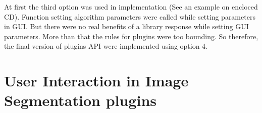 At first the third option was used in implementation (See an example on encloced CD). Function setting algorithm parameters were called while setting parameters in GUI. But there were no real benefits of a library response while setting GUI parameters. More than that the rules for plugins were too bounding. So therefore, the final version of plugins API were implemented using option 4.

\section{User Interaction in Image Segmentation plugins}

